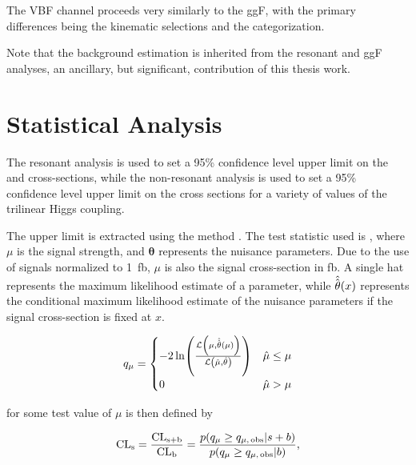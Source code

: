 The VBF channel proceeds very similarly to the ggF, with the primary differences being the 
kinematic selections and the categorization.


Note that the background estimation is inherited from the resonant and ggF analyses, 
an ancillary, but significant, contribution of this thesis work.

\FloatBarrier
\clearpage
\section{Statistical Analysis}
The resonant analysis is used to set a 95\% confidence level upper limit on the
\HepProcess{\Pp \Pp \to \PScal \to \higgs \higgs \to \Pqb \Paqb \Pqb \Paqb} and
\HepProcess{\Pp \Pp \to \PGrav \to \higgs \higgs \to \Pqb \Paqb \Pqb \Paqb} cross-sections, 
while the non-resonant analysis is used to set a 95\% confidence level upper limit on the
\HepProcess{\Pp \Pp \to \higgs \higgs \to \Pqb \Paqb \Pqb \Paqb} cross sections for a 
variety of values of the trilinear Higgs coupling.

The upper limit is extracted using the \CLs method \cite{Read02}. The test statistic 
used is \qmu \cite{Cowan11}, where $\mu$ is the signal strength, and $\mathbf{\theta}$ represents the nuisance
parameters. Due to the use of signals normalized to \SI{1}{\femto\barn}, $\mu$
is also the signal cross-section in \si{\femto\barn}. A single hat represents
the maximum likelihood estimate of a parameter, while
$\hat{\hat{\mathbf{\theta}}}\qty(x)$ represents the conditional maximum
likelihood estimate of the nuisance parameters if the signal cross-section is
fixed at $x$.


\begin{equation}
	\label{eqn:qmu-def}
	{q}_{\mu} =
	\begin{cases}
		-2\ln(\frac{\mathcal{L}\qty(\mu, \hat{\hat{\mathbf{\theta}}}\qty(\mu))}{\mathcal{L}\qty(\hat{\mu},
		\hat{\mathbf{\theta}})})              & \hat{\mu} \le \mu \\
		0                                     & \hat{\mu} > \mu
	\end{cases}
\end{equation}

\CLs for some test value of $\mu$ is then defined by

\begin{equation}
	\label{eqn:cls-def}
	\text{CL}\textsubscript{s} = \frac{\text{CL}\textsubscript{s+b}}{\text{CL}\textsubscript{b}} = \frac{p\qty({q}_{\mu} \ge {q}_{\mu,\,\text{obs}} | s + b)}{p\qty({q}_{\mu} \ge {q}_{\mu,\,\text{obs}} | b)},
\end{equation}

